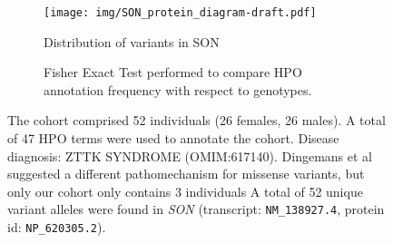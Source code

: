 \begin{figure}[htbp]
\centering
\begin{subfigure}[b]{0.95\textwidth}
\centering
\texttt{[image:  img/SON\_protein\_diagram-draft.pdf]} 
\captionsetup{justification=raggedright,singlelinecheck=false}
\caption{Distribution of variants in SON}
\end{subfigure}

\vspace{2em}

\begin{subfigure}[b]{0.95\textwidth}
\centering
{}
\captionsetup{justification=raggedright,singlelinecheck=false}
\caption{Fisher Exact Test performed to compare HPO annotation frequency with respect to genotypes.}
\end{subfigure}

\vspace{2em}

\caption{ The cohort comprised 52 individuals (26 females, 26 males). A total of 47 HPO terms were used to annotate the cohort. Disease diagnosis: ZTTK SYNDROME (OMIM:617140). Dingemans et al \cite{PMID_34521999} suggested a different pathomechanism for missense variants, but only our cohort only contains 3 individuals A total of 52 unique variant alleles were found in \textit{SON} (transcript: \texttt{NM\_138927.4}, protein id: \texttt{NP\_620305.2}).}
\end{figure}
